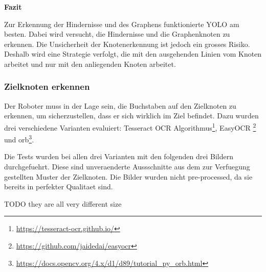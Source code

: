 \textbf{Fazit}

Zur Erkennung der Hindernisse und des Graphens funktionierte YOLO am besten. Dabei wird versucht, die Hindernisse und die Graphenknoten zu erkennen. Die Unsicherheit der Knotenerkennung ist jedoch ein grosses Risiko. Deshalb wird eine Strategie verfolgt, die mit den ausgehenden Linien vom Knoten arbeitet und nur mit den anliegenden Knoten arbeitet.

\subsubsection{Zielknoten erkennen}

Der Roboter muss in der Lage sein, die Buchstaben auf den Zielknoten zu erkennen, um sicherzustellen, dass er sich wirklich im Ziel befindet. Dazu wurden drei verschiedene Varianten evaluiert: Tesseract OCR Algorithmus\footnote{\url{https://tesseract-ocr.github.io/}}, EasyOCR \footnote{\url{https://github.com/jaidedai/easyocr}} und \acrfull{orb}\footnote{\url{https://docs.opencv.org/4.x/d1/d89/tutorial_py_orb.html}}.

Die Tests wurden bei allen drei Varianten mit den folgenden drei Bildern durchgefuehrt. Diese sind unveraenderte Aussschnitte aus dem zur Verfuegung gestellten Muster der Zielknoten. Die Bilder wurden nicht pre-processed, da sie bereits in perfekter Qualitaet sind.

TODO they are all very different size


